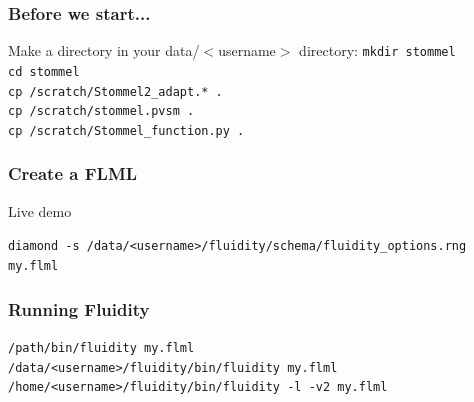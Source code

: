\documentclass[12pt]{beamer}
\begin{document}
\begin{frame}
    \frametitle{Before we start...}

Make a directory in your data/$<$username$>$ directory: \texttt{mkdir stommel}
\\
\texttt{cd stommel}
\\
\texttt{cp /scratch/Stommel2\_adapt.* .}
\\
\texttt{cp /scratch/stommel.pvsm .}
\\
\texttt{cp /scratch/Stommel\_function.py .}

\end{frame}


\begin{frame}
    \frametitle{Create a FLML}
Live demo

\texttt{diamond -s /data/<username>/fluidity/schema/fluidity\_options.rng my.flml}
\end{frame}

\begin{frame}
    \frametitle{Running Fluidity}
\scriptsize{\texttt{/path/bin/fluidity my.flml}}
\\
\scriptsize{\texttt{/data/<username>/fluidity/bin/fluidity my.flml}}
\\
\scriptsize{\texttt{/home/<username>/fluidity/bin/fluidity -l -v2 my.flml}}
\end{frame}
\end{document}
